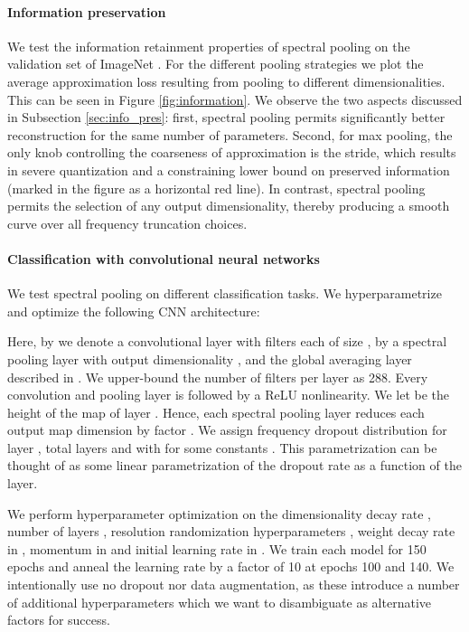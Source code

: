 \documentclass{article} \usepackage{nips15submit_e,times}
\begin{document}
\paragraph{Information preservation} We test the information retainment properties of spectral pooling on the validation set of ImageNet \citep{ILSVRC15}. For the different pooling strategies we plot the average approximation loss resulting from pooling to different dimensionalities. This can be seen in Figure \ref{fig:information}. We observe the two aspects discussed in Subsection \ref{sec:info_pres}: first, spectral pooling permits significantly better reconstruction for the same number of parameters. Second, for max pooling, the only knob controlling the coarseness of approximation is the stride, which results in severe quantization and a constraining lower bound on preserved information (marked in the figure as a horizontal red line). In contrast, spectral pooling permits the selection of any output dimensionality, thereby producing a smooth curve over all frequency truncation choices.

\paragraph{Classification with convolutional neural networks} We test spectral pooling on different classification tasks. We hyperparametrize and optimize the following CNN architecture:

Here, by  we denote a convolutional layer with  filters each of size , by  a spectral pooling layer with output dimensionality , and  the global averaging layer described in \citet{journals/corr/LinCY13}. We upper-bound the number of filters per layer as 288. Every convolution and pooling layer is followed by a ReLU nonlinearity. We let  be the height of the map of layer . Hence, each spectral pooling layer reduces each output map dimension by factor . We assign frequency dropout distribution  for layer , total layers  and with  for some constants . This parametrization can be thought of as some linear parametrization of the dropout rate as a function of the layer.

We perform hyperparameter optimization on the dimensionality decay rate , number of layers , resolution randomization hyperparameters , weight decay rate in , momentum in  and initial learning rate in . We train each model for 150 epochs and anneal the learning rate by a factor of 10 at epochs 100 and 140. We intentionally use no dropout nor data augmentation, as these introduce a number of additional hyperparameters which we want to disambiguate as alternative factors for success.
\end{document}

